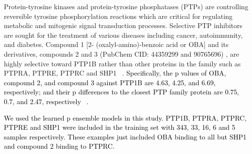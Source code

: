 \documentclass[nocrop]{bioinfo}
\newcommand{\red}[1]{\textcolor{black}{#1}}
\begin{document}
Protein-tyrosine kinases and protein-tyrosine phosphatases  (PTPs) are controlling reversible tyrosine phosphorylation reactions which are critical for regulating metabolic and  mitogenic signal transduction processes. Selective PTP inhibitors are sought for the treatment of various diseases including cancer, autoimmunity, and diabetes. Compound 1 [2- (oxalyl-amino)-benzoic acid or OBA] and its derivatives, compounds 2 and 3  (PubChem CID: 44359299 and 90765696) , are highly selective toward PTP1B rather than other proteins in the family such as PTPRA, PTPRE, PTPRC and SHP1 ~\citep{iversen2000structure}. \red{Specifically, the p values of OBA, compound 2, and compound 3 against PTP1B are 4.63, 4.25, and 6.69, respectively; and their p differences to the closest PTP family protein are 0.75, 0.7, and 2.47, respectively ~\citep{iversen2000structure}.}

\red{We used the learned p ensemble models in this study. PTP1B, PTPRA, PTPRC, PTPRE and SHP1 were included in the  training set with 343, 33, 16, 6 and 5 samples respectively. These examples just included OBA binding to all but SHP1 and compound 2 binding to PTPRC.} 
\end{document}
